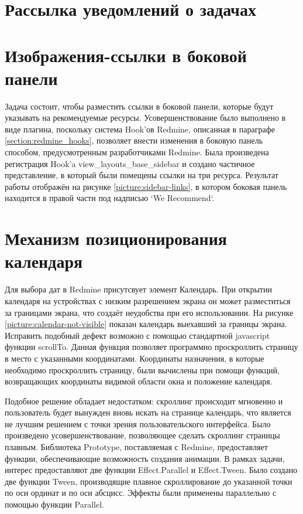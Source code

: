 \section{Рассылка уведомлений о задачах}


\section{Изображения-ссылки в боковой панели}
Задача состоит, чтобы разместить ссылки в боковой панели, которые будут
указывать на рекомендуемые ресурсы. Усовершенствование было выполнено в виде
плагина, поскольку система Hook'ов Redmine, описанная в параграфе
\ref{section:redmine_hooks}, позволяет внести изменения в боковую панель
способом, предусмотренным разработчиками Redmine. Была произведена регистрация
Hook'a view\_layouts\_base\_sidebar и создано частичное представление, в
который были помещены ссылки на три ресурса. Результат работы отображён на
рисунке \ref{picture:sidebar-links}, в котором боковая панель находится в
правой части под надписью `We Recommend`.


\section{Механизм позиционирования календаря}
Для выбора дат в Redmine присутсвует элемент Календарь. При открытии календаря
на устройствах с низким разрешением экрана он может разместиться за границами
экрана, что создаёт неудобства при его использовании. На рисунке
\ref{picture:calendar-not-visible} показан календарь выехавший за границы
экрана. Исправить подобный дефект возможно с помощью стандартной javascript
функции scrollTo. Данная функция позволяет программно проскроллить страницу в
место с указанными координатами. Координаты назначения, в которые необходимо
проскроллить страницу, были вычислены при помощи функций, возвращающих
координаты видимой области окна и положение календаря.

Подобное решение обладает недостатком: скроллинг происходит мгновенно и
пользователь будет вынужден вновь искать на странице календарь, что является не
лучшим решением с точки зрения пользовательского интерфейса. Было произведено
усовершенствование, позволяющее сделать скроллинг страницы плавным.
Библиотека Prototype, поставляемая с Redmine, предоставляет функции,
обеспечивающие возможность создания анимации. В рамках задачи, интерес
предоставляют две функции Effect.Parallel и Effect.Tween. Было создано две
функции Tween, производящие плавное скроллирование до указанной точки по оси
ординат и по оси абсцисс. Эффекты были применены параллельно с помощью функции
Parallel.

